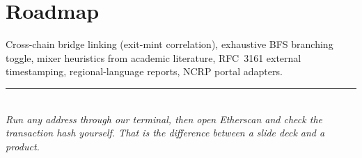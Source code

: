 \documentclass[11pt,a4paper]{article}
\begin{document}
\section{Roadmap}
Cross-chain bridge linking (exit-mint correlation), exhaustive BFS branching
toggle, mixer heuristics from academic literature, RFC~3161 external timestamping,
regional-language reports, NCRP portal adapters.

\vspace{1.5em}
\begin{center}
\textcolor{accent}{\rule{0.4\textwidth}{0.4pt}}\\[0.6em]
\textit{Run any address through our terminal, then open Etherscan and check the\\
transaction hash yourself. That is the difference between a slide deck and a product.}
\end{center}
\end{document}
